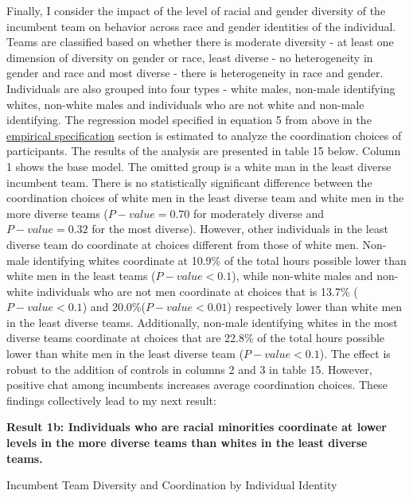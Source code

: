 \noindent Finally, I consider the impact of the level of racial and gender diversity of the incumbent team on behavior across race and gender identities of the individual. Teams are classified based on whether there is moderate diversity - at least one dimension of diversity on gender or race, least diverse - no heterogeneity in gender and race and most diverse - there is heterogeneity in race and gender. Individuals are also grouped into four types - white males, non-male identifying whites, non-white males and individuals who are not white and non-male identifying. The regression model specified in equation 5 from above in the \hyperref[subsec:Specification]{empirical specification} section is estimated to analyze the coordination choices of participants. The results of the analysis are presented in table 15 below. Column 1 shows the base model. The omitted group is a white man in the least diverse incumbent team. There is no statistically significant difference between the coordination choices of white men in the least diverse team and white men in the more diverse teams ($P-value=0.70$ for moderately diverse and $P-value=0.32$ for the most diverse). However, other individuals in the least diverse team do coordinate at choices different from those of white men. Non-male identifying whites coordinate at 10.9\% of the total hours possible lower than white men in the least teams ($P-value<0.1$), while non-white males and non-white individuals who are not men coordinate at choices that is 13.7\% ($P-value<0.1$) and 20.0\%($P-value<0.01$) respectively lower than white men in the least diverse teams. Additionally, non-male identifying whites in the most diverse teams coordinate at choices that are 22.8\% of the total hours possible lower than white men in the least diverse team ($P-value<0.1$). The effect is robust to the addition of controls in columns 2 and 3 in table 15. However, positive chat among incumbents increases average coordination choices. These findings collectively lead to my next result:

\textbf{Result 1b: Individuals who are racial minorities coordinate at lower levels in the more diverse teams than whites in the least diverse teams.}

\begin{table}[H]
 \captionsetup{justification=raggedright,singlelinecheck=false}
\caption{Incumbent Team Diversity and Coordination by Individual Identity } \label{tab:table8}
    \begin{center}
        
    \end{center}
\end{table}

